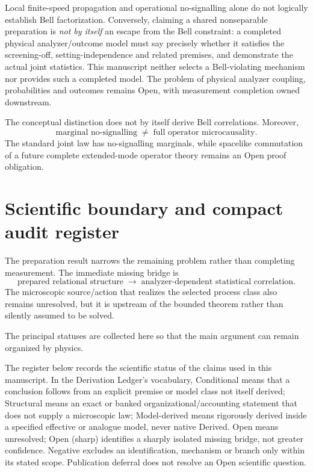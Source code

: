 \documentclass[11pt]{article}
\theoremstyle{remark}
\begin{document}
Local finite-speed propagation and operational no-signalling alone do not
logically establish Bell factorization.  Conversely, claiming a shared
nonseparable preparation is \emph{not by itself} an escape from the Bell
constraint: a completed physical analyzer/outcome model must say precisely
whether it satisfies the screening-off, setting-independence and related
premises, and demonstrate the actual joint statistics.  This manuscript
neither selects a Bell-violating mechanism nor provides such a completed
model.  The problem of physical analyzer coupling, probabilities and outcomes
remains Open, with measurement completion owned downstream.

The conceptual distinction does not by itself derive Bell correlations.
Moreover,
\begin{equation}
  \boxed{\text{marginal no-signalling}\;\neq\;\text{full operator microcausality}.}
  \label{eq:no_signal_not_micro}
\end{equation}
The standard joint law has no-signalling marginals, while spacelike commutation of a future complete
extended-mode operator theory remains an Open proof obligation.

\section{Scientific boundary and compact audit register}
\label{sec:boundary}

The preparation result narrows the remaining problem rather than completing measurement.  The
immediate missing bridge is
\begin{equation}
  \boxed{
  \text{prepared relational structure}
  \;\longrightarrow\;
  \text{analyzer-dependent statistical correlation}.}
  \label{eq:sharp_boundary}
\end{equation}
The microscopic source/action that realizes the selected process class also remains unresolved, but
it is upstream of the bounded theorem rather than silently assumed to be solved.

The principal statuses are collected here so that the main argument can remain organized by physics.

The register below records the scientific status of the claims used in
this manuscript.  In the Derivation Ledger's vocabulary, Conditional means
that a conclusion follows from an explicit premise or model class not itself
derived; Structural means an exact or banked organizational/accounting statement
that does not supply a microscopic law; Model-derived means rigorously derived
inside a specified effective or analogue model, never native Derived.
Open means unresolved; Open (sharp) identifies a sharply isolated missing
bridge, not greater confidence.  Negative excludes an identification, mechanism
or branch only within its stated scope.  Publication deferral does not resolve
an Open scientific question.
\end{document}

